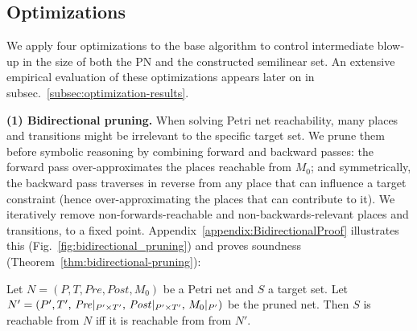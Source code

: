 %


\subsection{Optimizations}
\label{sec:optimizations}


We apply four optimizations to the base algorithm to control intermediate blow‐up in the size of both the PN and the constructed semilinear set. 
%
An extensive empirical evaluation of these optimizations appears later on in subsec.~\ref{subsec:optimization-results}.

\medskip
\noindent
\textbf{(1) Bidirectional pruning.}  
When solving Petri net reachability, many places and transitions might be irrelevant to the specific target set.  
	We prune them before symbolic reasoning by combining forward and backward passes:  
	the forward pass over-approximates the places reachable from $M_0$; and symmetrically,   
	the backward pass traverses in reverse from any place that can influence a target constraint (hence over-approximating the places that can contribute to it).
	We iteratively remove non-forwards-reachable and
	non-backwards-relevant places and transitions, to a fixed point.  
	Appendix~\ref{appendix:BidirectionalProof} illustrates this (Fig.~\ref{fig:bidirectional_pruning}) and proves soundness (Theorem~\ref{thm:bidirectional-pruning}):



\begin{theorem}
	\label{thm:bidirectional-pruning}
	Let $N = (P, T, Pre, Post, M_0)$ be a Petri net and $S$ a target set.  
	Let $N' = (P',T',\,\mathit{Pre}|_{P'\times T'},\,\mathit{Post}|_{P'\times T'},\,M_0|_{P'})$ be the pruned net.  
	Then $S$ is reachable from $N$ iff it is reachable from from $N'$.
\end{theorem}
%
%

